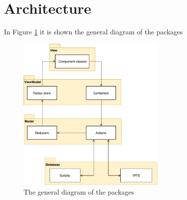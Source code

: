 \section{Architecture}
In Figure \ref{fig:modelDiagram} it is shown the general diagram of the packages 
\begin{figure}[!h]
	\centering
	\includegraphics[height=3in]{img/generalPackageDiagram.pdf}
	\caption{The general diagram of the packages}
	\label{fig:modelDiagram}
\end{figure}